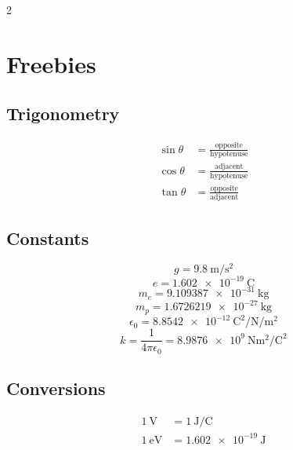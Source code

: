 
\begin{multicols*}{2}
\section{Freebies}\label{sec:freebies}
\subsection{Trigonometry}

\begin{equation*}
\begin{aligned}
    \sin \theta &= \frac{\mathrm{opposite}}{\mathrm{hypotenuse}} \\[4pt]
    \cos \theta &= \frac{\mathrm{adjacent}}{\mathrm{hypotenuse}} \\[4pt]
    \tan \theta &= \frac{\mathrm{opposite}}{\mathrm{adjacent}}
\end{aligned}
\end{equation*}

\subsection{Constants}

\begin{equation*}
    g = \qty{9.8}{\meter\per\square\second}
\end{equation*}
\begin{equation*}
    e = \qty{1.602e-19}{\coulomb}
\end{equation*}
\begin{equation*}
    m_e = \qty{9.109387e-31}{\kilo\gram}
\end{equation*}
\begin{equation*}
    m_p = \qty{1.6726219e-27}{\kilo\gram}
\end{equation*}
\begin{equation*}
    \epsilon_0 = \qty{8.8542e-12}{\square\coulomb\per\newton\per\square\meter}
\end{equation*}
\begin{equation*}
    k = \frac{1}{4\pi\epsilon_0} = \qty{8.9876e9}{\newton\square\meter\per\square\coulomb}
\end{equation*}

\subsection{Conversions}

\begin{equation*}
\begin{aligned}
    \qty{1}{\volt}          &= \qty{1}{\joule\per\coulomb}      \\[4pt]
    \qty{1}{\electronvolt}  &= \qty{1.602e-19}{\joule}
\end{aligned}
\end{equation*}


\end{multicols*}
